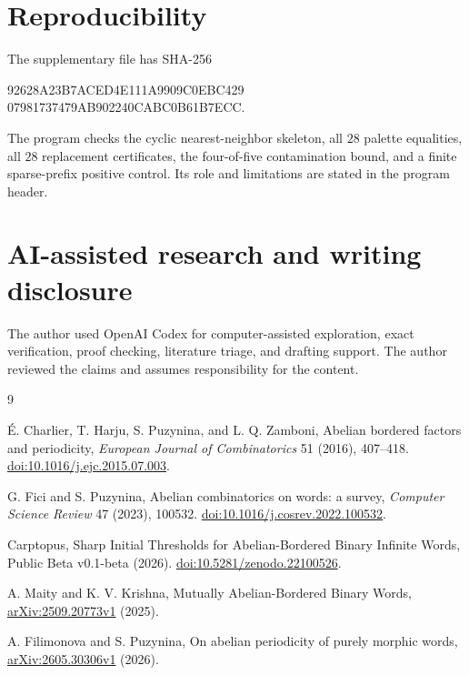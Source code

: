 \documentclass[11pt]{article}
\begin{document}
\section{Reproducibility}

The supplementary file  has
SHA-256
\begin{center}
\small\ttfamily
92628A23B7ACED4E111A9909C0EBC429\\
07981737479AB902240CABC0B61B7ECC.
\end{center}
The program checks the cyclic nearest-neighbor skeleton, all $28$ palette equalities, all
$28$ replacement certificates, the four-of-five contamination bound, and a
finite sparse-prefix positive control. Its role and limitations are stated in
the program header.

\section*{AI-assisted research and writing disclosure}

The author used OpenAI Codex for computer-assisted exploration, exact
verification, proof checking, literature triage, and drafting support. The
author reviewed the claims and assumes responsibility for the content.

\begin{thebibliography}{9}

\'E. Charlier, T. Harju, S. Puzynina, and L. Q. Zamboni,
Abelian bordered factors and periodicity,
\emph{European Journal of Combinatorics} 51 (2016), 407--418.
\href{https://doi.org/10.1016/j.ejc.2015.07.003}{doi:10.1016/j.ejc.2015.07.003}.

G. Fici and S. Puzynina,
Abelian combinatorics on words: a survey,
\emph{Computer Science Review} 47 (2023), 100532.
\href{https://doi.org/10.1016/j.cosrev.2022.100532}{doi:10.1016/j.cosrev.2022.100532}.

Carptopus,
Sharp Initial Thresholds for Abelian-Bordered Binary Infinite Words,
Public Beta v0.1-beta (2026).
\href{https://doi.org/10.5281/zenodo.22100526}{doi:10.5281/zenodo.22100526}.

A. Maity and K. V. Krishna,
Mutually Abelian-Bordered Binary Words,
\href{https://arxiv.org/abs/2509.20773}{arXiv:2509.20773v1} (2025).

A. Filimonova and S. Puzynina,
On abelian periodicity of purely morphic words,
\href{https://arxiv.org/abs/2605.30306}{arXiv:2605.30306v1} (2026).

\end{thebibliography}
\end{document}
